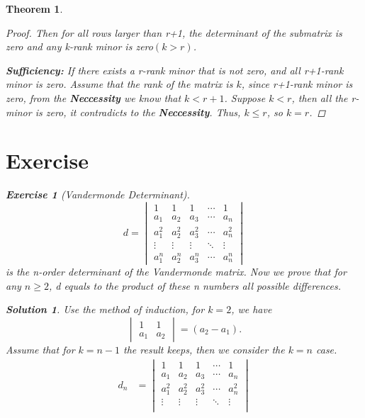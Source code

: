 \documentclass{article}
\newtheorem{theorem}{Theorem}[section]
\theoremstyle{definition}
\newtheorem{exercise}{Exercise}[section]
\newtheorem{solution}{Solution}[exercise]
\begin{document}
\begin{theorem}
\begin{proof}
    Then for all rows larger than r+1, the determinant of the submatrix
    is zero and any k-rank minor is zero$(k>r)$.

    \textbf{Sufficiency:}
    If there exists a r-rank minor that is not zero,
    and all r+1-rank minor is zero. Assume that the rank 
    of the matrix is $k$, since r+1-rank minor is zero, from the \textbf{Neccessity}
    we know that $k<r+1$. Suppose $k<r$, then all the r-minor is zero, it contradicts 
    to the \textbf{Neccessity}. Thus, $k\leq r$, so $k=r$.
\end{proof}








\newpage
\section{Exercise}
\begin{exercise}[Vandermonde Determinant]
$$d=
\begin{vmatrix}
    1 & 1 & 1 & \cdots & 1\\
    a_{1} & a_{2} & a_{3} & \cdots & a_{n}\\
    a_{1}^{2} & a_{2}^{2} & a_{3}^{2} & \cdots & a_{n}^{2}\\
    \vdots & \vdots & \vdots & \ddots & \vdots\\
    a_{1}^{n} & a_{2}^{n} & a_{3}^{n} & \cdots & a_{n}^{n}
\end{vmatrix}$$
is the n-order determinant of the Vandermonde matrix.
Now we prove that for any $n \geq 2$, d equals to the product of 
these n numbers all possible differences.
\end{exercise}
\begin{solution}
Use the method of induction, for $k=2$, we have
$$
\begin{vmatrix}
    1 & 1 \\
    a_{1} & a_{2}
\end{vmatrix}
=(a_{2}-a_{1}).$$
Assume that for $k=n-1$ the result keeps, then we
consider the $k=n$ case.
\begin{align*}
d_{n} 
& =
\begin{vmatrix}
    1 & 1 & 1 & \cdots & 1 \\
    a_{1} & a_{2} & a_{3} & \cdots & a_{n} \\
    a_{1}^{2} & a_{2}^{2} & a_{3}^{2} & \cdots & a_{n}^{2} \\
    \vdots & \vdots & \vdots & \ddots & \vdots \\

\end{vmatrix}
\end{align*}
\end{solution}
\end{theorem}
\end{document}
